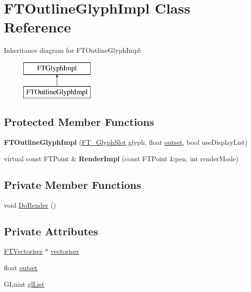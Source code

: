\hypertarget{class_f_t_outline_glyph_impl}{}\section{F\+T\+Outline\+Glyph\+Impl Class Reference}
\label{class_f_t_outline_glyph_impl}
Inheritance diagram for F\+T\+Outline\+Glyph\+Impl\+:\begin{figure}[H]
\begin{center}
\leavevmode
\includegraphics[height=2.000000cm]{class_f_t_outline_glyph_impl}
\end{center}
\end{figure}
\subsection*{Protected Member Functions}
\begin{DoxyCompactItemize}
\item 
{\bfseries F\+T\+Outline\+Glyph\+Impl} (\hyperlink{struct_f_t___glyph_slot_rec__}{F\+T\+\_\+\+Glyph\+Slot} glyph, float \hyperlink{class_f_t_outline_glyph_impl_a35dc72ebbe89caaa6e9011fcfd342e93}{outset}, bool use\+Display\+List)\hypertarget{class_f_t_outline_glyph_impl_a0eac191ec3db6c8dbbf6956ded4342fa}{}\label{class_f_t_outline_glyph_impl_a0eac191ec3db6c8dbbf6956ded4342fa}

\item 
virtual const F\+T\+Point \& {\bfseries Render\+Impl} (const F\+T\+Point \&pen, int render\+Mode)\hypertarget{class_f_t_outline_glyph_impl_a554ed38dfe9a113804394c35e9ef9d35}{}\label{class_f_t_outline_glyph_impl_a554ed38dfe9a113804394c35e9ef9d35}

\end{DoxyCompactItemize}
\subsection*{Private Member Functions}
\begin{DoxyCompactItemize}
\item 
void \hyperlink{class_f_t_outline_glyph_impl_a04cb3bf9d5226bdf7029b4b45dab7001}{Do\+Render} ()
\end{DoxyCompactItemize}
\subsection*{Private Attributes}
\begin{DoxyCompactItemize}
\item 
\hyperlink{class_f_t_vectoriser}{F\+T\+Vectoriser} $\ast$ \hyperlink{class_f_t_outline_glyph_impl_ae4dab6177d2727633d49456fa475b941}{vectoriser}
\item 
float \hyperlink{class_f_t_outline_glyph_impl_a35dc72ebbe89caaa6e9011fcfd342e93}{outset}
\item 
G\+Luint \hyperlink{class_f_t_outline_glyph_impl_ad8db38cd75ad268910eac43047c9f575}{gl\+List}
\end{DoxyCompactItemize}
